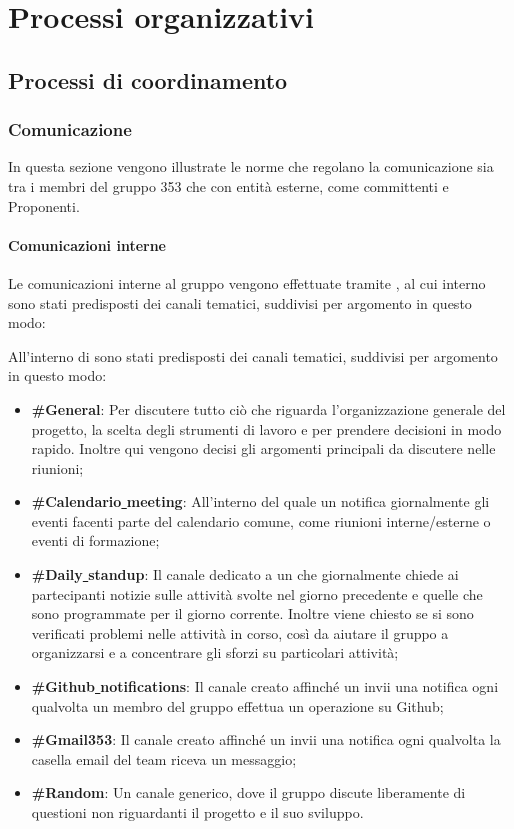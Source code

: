 \documentclass[NormeDiProgetto.tex]{subfiles}
\begin{document}
	\chapter{Processi organizzativi}

	\section{Processi di coordinamento}
	
	\subsection{Comunicazione}
	In questa sezione vengono illustrate le norme che regolano la comunicazione sia tra i membri del gruppo 353 che con entità esterne, come committenti e Proponenti.
	\subsubsection{Comunicazioni interne}
	Le comunicazioni interne al gruppo vengono effettuate tramite , al cui interno sono stati predisposti dei canali tematici, suddivisi per argomento in questo modo:

	All'interno di  sono stati predisposti dei canali tematici, suddivisi per argomento in questo modo:
	\begin{itemize}
		\item \textbf{\#General}: Per discutere tutto ciò che riguarda l'organizzazione generale del progetto, la scelta degli strumenti di lavoro e per prendere decisioni in modo rapido. Inoltre qui vengono decisi gli argomenti principali da discutere nelle riunioni;
		\item \textbf{\#Calendario\underline{ }meeting}: All'interno del quale un  notifica giornalmente gli eventi facenti parte del calendario comune, come riunioni interne/esterne o eventi di formazione;
		\item \textbf{\#Daily\underline{ }standup}: Il canale dedicato a un  che giornalmente chiede ai partecipanti notizie sulle attività svolte nel giorno precedente e quelle che sono programmate per il giorno corrente. Inoltre viene chiesto se si sono verificati problemi nelle attività in corso, così da aiutare il gruppo a organizzarsi e a concentrare gli sforzi su particolari attività;
		\item \textbf{\#Github\underline{ }notifications}: Il canale creato affinché un  invii una notifica ogni qualvolta un membro del gruppo effettua un operazione su Github;
		\item \textbf{\#Gmail353}: Il canale creato affinché un  invii una notifica ogni qualvolta la casella email del team riceva un messaggio;
		\item \textbf{\#Random}: Un canale generico, dove il gruppo discute liberamente di questioni non riguardanti il progetto e il suo sviluppo.	
	\end{itemize}
\end{document}
